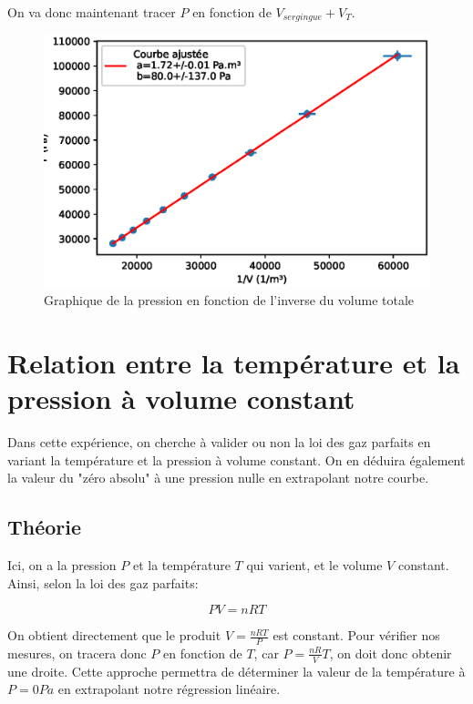 \documentclass[12pt]{article}
\begin{document}
On va donc maintenant tracer $P$ en fonction de $V_{sergingue}+V_T$.
\begin{figure}[h!]
	\begin{center}
		\includegraphics[scale=1]{img/G3Exp1.eps}
		\caption{Graphique de la pression en fonction de l'inverse du volume totale}
	\end{center}
\end{figure}

\newpage
\section{Relation entre la température et la pression à volume constant}
Dans cette expérience, on cherche à valider ou non la loi des gaz parfaits en variant la température et la pression
à volume constant. On en déduira également la valeur du "zéro absolu" à une pression nulle en extrapolant notre courbe.

\subsection{Théorie}
Ici, on a la pression $P$ et la température $T$ qui varient, et le volume $V$ constant. Ainsi, selon la loi des gaz parfaits:

\begin{equation}
    PV = nRT
\end{equation}

On obtient directement que le produit $V = \frac{nRT}{P}$ est constant. Pour vérifier nos mesures, on tracera donc $P$ en fonction de $T$, 
car $P = \frac{nR}{V} T$, on doit donc obtenir une droite. Cette approche permettra de déterminer la valeur de la température à $P=0Pa$ en extrapolant notre régression linéaire.
\end{document}
